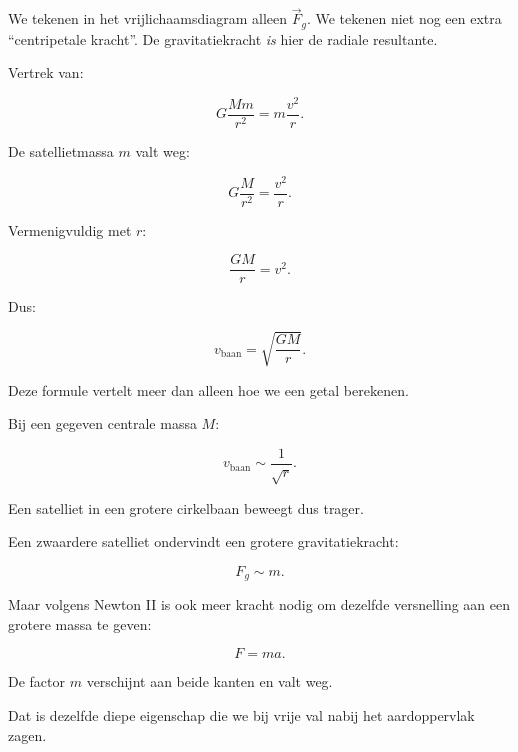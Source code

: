 \documentclass{ximera}
\begin{document}
\begin{opmerking}
We tekenen in het vrijlichaamsdiagram alleen $\vec F_g$. We tekenen
niet nog een extra ``centripetale kracht''. De gravitatiekracht
\emph{is} hier de radiale resultante.
\end{opmerking}




Vertrek van:

\[
G\frac{Mm}{r^2}
=
m\frac{v^2}{r}.
\]

De satellietmassa $m$ valt weg:

\[
G\frac{M}{r^2}
=
\frac{v^2}{r}.
\]

Vermenigvuldig met $r$:

\[
\frac{GM}{r}=v^2.
\]

Dus:

\[
\boxed{
v_{\mathrm{baan}}
=
\sqrt{\frac{GM}{r}}.
}
\]

Deze formule vertelt meer dan alleen hoe we een getal berekenen.

Bij een gegeven centrale massa $M$:

\[
\boxed{
v_{\mathrm{baan}}\sim\frac1{\sqrt r}.
}
\]

Een satelliet in een grotere cirkelbaan beweegt dus trager.



Een zwaardere satelliet ondervindt een grotere gravitatiekracht:

\[
F_g\sim m.
\]

Maar volgens Newton II is ook meer kracht nodig om dezelfde versnelling
aan een grotere massa te geven:

\[
F=ma.
\]

De factor $m$ verschijnt aan beide kanten en valt weg.

Dat is dezelfde diepe eigenschap die we bij vrije val nabij het
aardoppervlak zagen.
\end{document}
